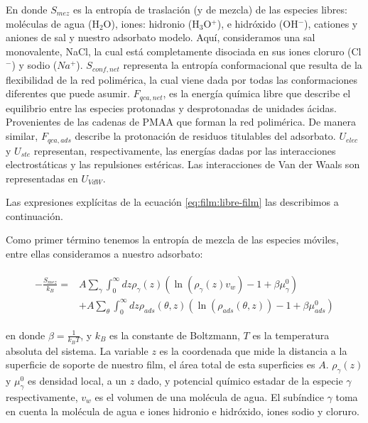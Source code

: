 \noindent En donde $S_{mez}$ es la entrop\'ia de traslaci\'on (y de mezcla) de las especies libres: mol\'eculas de agua (H$_2$O), iones:  hidronio (H$_3$O$^+$), e hidr\'oxido (OH$^- $), cationes y aniones de sal y nuestro adsorbato modelo. Aqu\'i, consideramos una sal monovalente, NaCl, la cual est\'a completamente disociada en sus  iones cloruro (Cl$^-$) y sodio ($Na^+$). 
$S_{conf,net}$ representa la entrop\'ia conformacional que resulta de la flexibilidad de la red polim\'erica, la cual viene dada por todas las conformaciones diferentes que puede asumir.
$F_{qca,net}$, es la energ\'ia qu\'imica libre que describe el equilibrio entre las especies protonadas y desprotonadas de unidades \'acidas. Provenientes de las cadenas de PMAA que forman la red polim\'erica.
De manera similar, $F_{qca,ads}$ describe la protonaci\'on de residuos titulables del adsorbato.
$U_{elec}$ y $U_{ste}$ representan, respectivamente, las energ\'ias dadas por las interacciones electrost\'aticas y las repulsiones est\'ericas.
Las interacciones de Van der Waals son representadas en $U_{VdW}$.


Las expresiones expl\'icitas de la ecuaci\'on \ref{eq:film:libre-film} las describimos a continuaci\'on.

Como primer t\'ermino tenemos la entrop\'ia de mezcla de  las especies m\'oviles, entre ellas consideramos a nuestro adsorbato: 

\begin{align}
	\begin{aligned}
		-\frac{S_{mez}}{k_B}= &A\sum_{\gamma}\int_0^\infty{dz\rho_\gamma(z)\left(\ln \left(\rho_\gamma (z)v_w\right) -1 + \beta\mu^0_\gamma\right)} \\
		&+ A\sum_{\theta}\int_0^\infty{dz\rho_{ads}(\theta,z)\left(\ln \left(\rho_{ads}(\theta,z)\right) -1 + \beta\mu^0_{ads} \right)}
			\label{eq:film:entropia-mezcla}
	\end{aligned}
\end{align}

\noindent en donde $\beta = \frac{1}{k_B T}$, y $k_B$ es la constante de Boltzmann, $T$ es la temperatura absoluta del sistema. La variable $z$ es la coordenada que mide la distancia a la superficie de soporte de nuestro film, el \'area total de esta superficies es $A$. $\rho_\gamma(z)$ y $\mu^0_\gamma$ es densidad local, a un $z$ dado, y potencial qu\'imico estadar de la especie $\gamma$ respectivamente, $v_w$ es el volumen de una mol\'ecula de agua.
El sub\'indice $\gamma$ toma en cuenta la mol\'ecula de agua e iones hidronio e hidr\'oxido, iones sodio y cloruro.  


